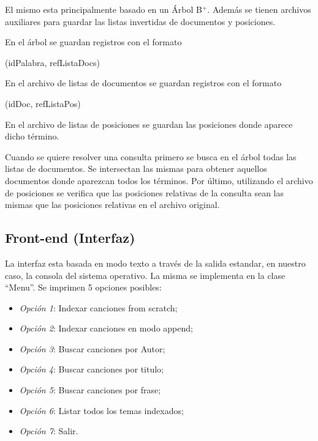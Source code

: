 \documentclass{article}
\begin{document}
	El mismo esta principalmente basado en un Árbol B$^+$. Además se tienen archivos auxiliares para guardar las listas invertidas de documentos y posiciones.
	\par
	En el árbol se guardan registros con el formato
	\bigskip

	{\ttfamily\footnotesize
	(idPalabra, refListaDocs) \\}
	 
	En el archivo de listas de documentos se guardan registros con el formato
	\bigskip

	{\ttfamily\footnotesize
	(idDoc, refListaPos) \\}
	
	En el archivo de listas de posiciones se guardan las posiciones donde aparece dicho término.
	\par
	Cuando se quiere resolver una consulta primero se busca en el árbol todas las listas de documentos. Se intersectan las mismas para obtener aquellos documentos donde aparezcan todos los términos. Por último, utilizando el archivo de posiciones se verifica que las posiciones relativas de la consulta sean las mismas que las posiciones relativas en el archivo original.
\bigskip\bigskip




\subsection{Front-end (Interfaz)}
\medskip

	La interfaz esta basada en modo texto a través de la salida estandar, en nuestro caso, la consola del sistema operativo. La misma se implementa en la clase ``Menu''. Se imprimen 5 opciones posibles:


	\begin{itemize}
	\itemsep=5pt \topsep=0pt \partopsep=0pt \parskip=0pt \parsep=0pt

		\item \textit{Opción 1}: Indexar canciones from scratch;
		\item \textit{Opción 2}: Indexar canciones en modo append;
		\item \textit{Opción 3}: Buscar canciones por Autor;
		\item \textit{Opción 4}: Buscar canciones por titulo;
		\item \textit{Opción 5}: Buscar canciones por frase;
		\item \textit{Opción 6}: Listar todos los temas indexados;
		\item \textit{Opción 7}: Salir.

	\end{itemize}
	\medskip
\end{document}
